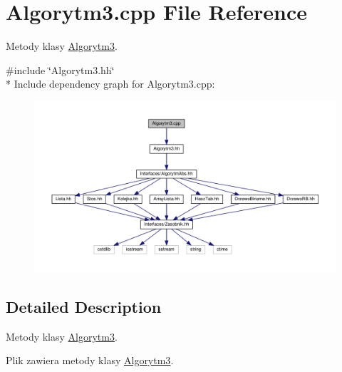\hypertarget{a00024}{}\section{Algorytm3.\+cpp File Reference}
\label{a00024}


Metody klasy \hyperlink{a00004}{Algorytm3}.  


{\ttfamily \#include \char`\"{}Algorytm3.\+hh\char`\"{}}\\*
Include dependency graph for Algorytm3.\+cpp\+:
\nopagebreak
\begin{figure}[H]
\begin{center}
\leavevmode
\includegraphics[width=350pt]{a00066}
\end{center}
\end{figure}


\subsection{Detailed Description}
Metody klasy \hyperlink{a00004}{Algorytm3}. 

Plik zawiera metody klasy \hyperlink{a00004}{Algorytm3}. 